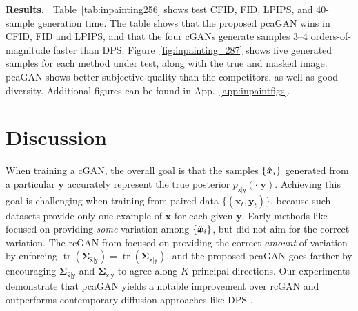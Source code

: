 \documentclass{article}
\theoremstyle{plain}
\theoremstyle{definition}
\theoremstyle{remark}
\renewcommand{\hat}{\widehat}
\newcommand{\hvec}[1]{\ensuremath{\Hat{\boldsymbol{#1}}}}
\renewcommand{\vec}[1]{\ensuremath{\boldsymbol{#1}}}
\DeclareMathOperator{\tr}{tr}
\newcommand{\Figref}[1]{Figure~\ref{fig:#1}}
\newcommand{\tabref}[1]{Table~\ref{tab:#1}}
\newcommand{\appref}[1]{App.~\ref{app:#1}}
\newcommand{\pxgy}{p_{\mathsf{x}|\mathsf{y}}}
\newcommand{\Sigxgy}{\vec{\Sigma}_{\mathsf{x}|\mathsf{y}}}
\newcommand{\Sigxgyhat}{\vec{\Sigma}_{\hat{\mathsf{x}}|\mathsf{y}}}
\begin{document}

\textbf{Results.~} 
\tabref{inpainting256} shows test CFID, FID, LPIPS, and 40-sample generation time.
The table shows that the proposed pcaGAN wins in CFID, FID and LPIPS, and that the four cGANs generate samples 3--4 orders-of-magnitude faster than DPS.
\Figref{inpainting_287} shows five generated samples for each method under test, along with the true and masked image.
pcaGAN shows better subjective quality than the competitors, as well as good diversity.
Additional figures can be found in \appref{inpaintfigs}.

\section{Discussion} \label{sec:discussion}
When training a cGAN, the overall goal is that the samples $\{\hvec{x}_i\}$ generated from a particular $\vec{y}$ accurately represent the true posterior $\pxgy(\cdot|\vec{y})$.
Achieving this goal is challenging when training from paired data $\{(\vec{x}_t,\vec{y}_t)\}$, because such datasets provide only one example of $\vec{x}$ for each given $\vec{y}$.
Early methods like \cite{Isola:CVPR:17,Adler:18,Zhao:ICLR:21} focused on providing \emph{some} variation among $\{\hvec{x}_i\}$, but did not aim for the correct variation.
The rcGAN from \cite{Bendel:NIPS:23} focused on providing the correct \emph{amount} of variation by enforcing $\tr(\Sigxgyhat)=\tr(\Sigxgy)$, 
and the proposed pcaGAN goes farther by encouraging $\Sigxgyhat$ and $\Sigxgy$ to agree along $K$ principal directions.
Our experiments demonstrate that pcaGAN yields a notable improvement over rcGAN and outperforms contemporary diffusion approaches like DPS \cite{Chung:ICLR:23}.
\end{document}
